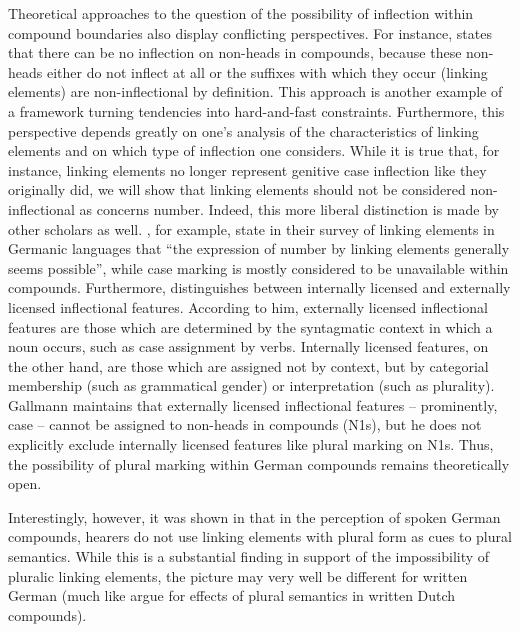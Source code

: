 Theoretical approaches to the question of the possibility of inflection within compound boundaries also display conflicting perspectives.
For instance, \textcite[9]{Schluecker2012} states that there can be no inflection on non-heads in compounds, because these non-heads either do not inflect at all or the suffixes with which they occur (\ie linking elements) are non-inflectional by definition.
This approach is another example of a framework turning tendencies into hard-and-fast constraints.
Furthermore, this perspective depends greatly on one's analysis of the characteristics of linking elements and on which type of inflection one considers.
While it is true that, for instance, linking elements no longer represent genitive case inflection like they originally did, we will show that linking elements should not be considered non-inflectional as concerns number.
Indeed, this more liberal distinction is made by other scholars as well.
\textcite[577]{FuhrhopKuerschner2015}, for example, state in their survey of linking elements in Germanic languages that ``the expression of number by linking elements generally seems possible'', while case marking is mostly considered to be unavailable within compounds.
Furthermore, \textcite[178--180]{Gallmann1998} distinguishes between internally licensed and externally licensed inflectional features.
According to him, externally licensed inflectional features are those which are determined by the syntagmatic context in which a noun occurs, such as case assignment by verbs.
Internally licensed features, on the other hand, are those which are assigned not by context, but by categorial membership (such as grammatical gender) or interpretation (such as plurality).
Gallmann maintains that externally licensed inflectional features -- prominently, case -- cannot be assigned to non-heads in compounds (N1s), but he does not explicitly exclude internally licensed features like plural marking on N1s.
Thus, the possibility of plural marking within German compounds remains theoretically open.

Interestingly, however, it was shown in \textcite{KoesterEa2004} that in the perception of spoken German compounds, hearers do not use linking elements with plural form as cues to plural semantics.
While this is a substantial finding in support of the impossibility of pluralic linking elements, the picture may very well be different for written German (much like \citealt{SchreuderEa1998} argue for effects of plural semantics in written Dutch compounds).

